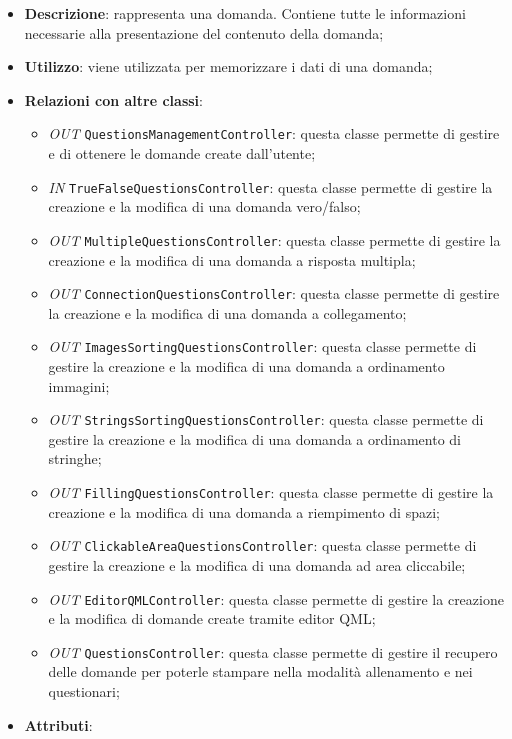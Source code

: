 		\begin{itemize}
			\item \textbf{Descrizione}: rappresenta una domanda. Contiene tutte le informazioni necessarie alla
			presentazione del contenuto della domanda;
			\item \textbf{Utilizzo}: viene utilizzata per memorizzare i dati di una domanda;
			\item \textbf{Relazioni con altre classi}: 
			\begin{itemize}
				\item \textit{OUT} \texttt{QuestionsManagementController}: questa classe permette di gestire e di ottenere le domande create dall'utente;
				\item \textit{IN} \texttt{TrueFalseQuestionsController}: questa classe permette di gestire la creazione e la modifica di una domanda vero/falso;
				\item \textit{OUT} \texttt{MultipleQuestionsController}: questa classe permette di gestire la creazione e la modifica di una domanda a risposta multipla; 
				\item \textit{OUT} \texttt{ConnectionQuestionsController}: questa classe permette di gestire la creazione e la modifica di una domanda a collegamento;
				\item \textit{OUT} \texttt{ImagesSortingQuestionsController}: questa classe permette di gestire la creazione e la modifica di una domanda a ordinamento immagini;
				\item \textit{OUT} \texttt{StringsSortingQuestionsController}: questa classe permette di gestire la creazione e la modifica di una domanda a ordinamento di stringhe;
				\item \textit{OUT} \texttt{FillingQuestionsController}: questa classe permette di gestire la creazione e la modifica di una domanda a riempimento di spazi; 
				\item \textit{OUT} \texttt{ClickableAreaQuestionsController}: questa classe permette di gestire la creazione e la modifica di una domanda ad area cliccabile;
				\item \textit{OUT} \texttt{EditorQMLController}: questa classe permette di gestire la creazione e la modifica di domande create tramite editor QML;
				\item \textit{OUT} \texttt{QuestionsController}: questa classe permette di gestire il recupero delle domande per poterle stampare nella modalità allenamento e nei questionari;
			\end{itemize}
			\item \textbf{Attributi}: 

\end{itemize}
